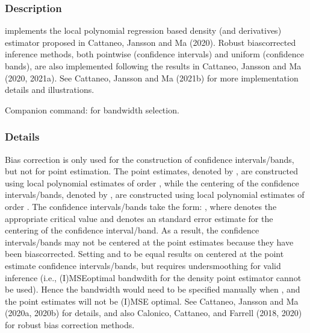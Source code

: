 \documentclass[letterpaper,10pt,english]{sphinxmanual}
\begin{document}
\subsubsection{Description}
\label{\detokenize{lpdensity:description}}
\sphinxAtStartPar
{} implements the local polynomial regression based density (and derivatives) estimator proposed in Cattaneo, Jansson and Ma (2020).  Robust bias\sphinxhyphen{}corrected inference methods,
both pointwise (confidence intervals) and uniform (confidence bands), are also implemented
following the results in Cattaneo, Jansson and Ma (2020, 2021a).
See Cattaneo, Jansson and Ma (2021b) for more implementation details and illustrations.

\sphinxAtStartPar
Companion command:  for bandwidth selection.


\subsubsection{Details}
\label{\detokenize{lpdensity:details}}
\sphinxAtStartPar
Bias correction is only used for the construction of confidence intervals/bands, but not for point
estimation. The point estimates, denoted by , are constructed using local polynomial estimates
of order , while the centering of the confidence intervals/bands, denoted by , are constructed
using local polynomial estimates of order . The confidence intervals/bands take the form:
\sphinxstyleemphasis{{[}f\_q \sphinxhyphen{} cv * SE(f\_q) , f\_q + cv * SE(f\_q){]}}, where  denotes the appropriate critical value and 
denotes an standard error estimate for the centering of the confidence interval/band. As a result,
the confidence intervals/bands may not be centered at the point estimates because they have been bias\sphinxhyphen{}corrected.
Setting  and  to be equal results on centered at the point estimate confidence intervals/bands,
but requires undersmoothing for valid inference (i.e., (I)MSE\sphinxhyphen{}optimal bandwdith for the density point estimator
cannot be used). Hence the bandwidth would need to be specified manually when , and the
point estimates will not be (I)MSE optimal. See Cattaneo, Jansson and Ma (2020a, 2020b) for details, and also
Calonico, Cattaneo, and Farrell (2018, 2020) for robust bias correction methods.
\end{document}

